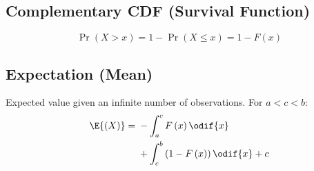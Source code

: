 \documentclass{article}
\begin{document}
\begin{multicols}{3}
        \subsection{Complementary CDF (Survival Function)}
        \begin{equation*}
            \Pr{\left( X > x \right)} = 1 - \Pr{\left( X \leq x \right)} = 1 - F\left( x \right)
        \end{equation*}
        \subsection{Expectation (Mean)}
        Expected value given an infinite number of observations. For \(a < c < b\):
        \begin{equation*}
            \E{\left(X\right)} = \begin{aligned}[t]
                 & -\int_{a}^c F\left( x \right) \odif{x}                     \\
                 & + \int_c^b \left(1 - F\left( x \right)\right) \odif{x} + c
            \end{aligned}
        \end{equation*}

\end{multicols}
\end{document}
